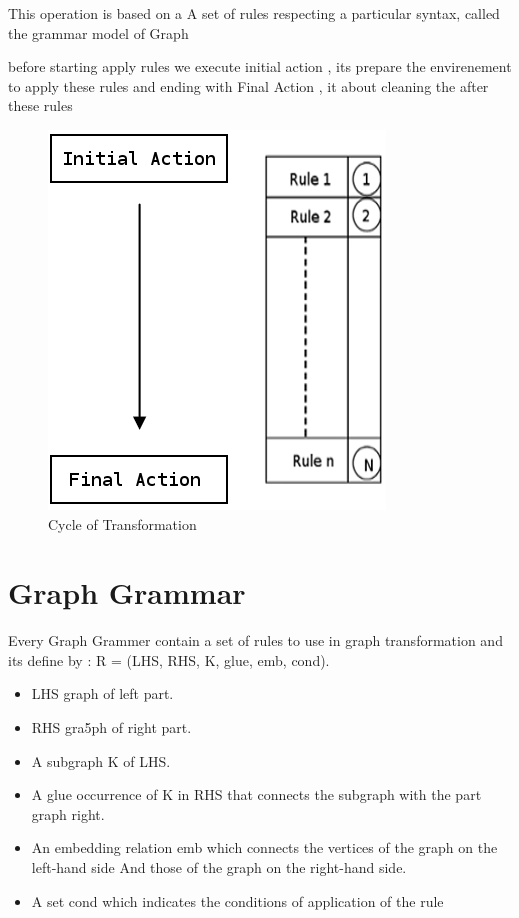  
This operation is based on a
A set of rules respecting a particular syntax, called the grammar model of
Graph

before starting apply rules we execute initial action , 
its prepare the envirenement to apply these rules
and ending with Final Action , it about cleaning the after these rules
\cite{ ch3-bid , ch3-spec }
\begin{figure}[th]
	\centering
		\includegraphics[scale=0.6]{Chapiter3/img/transGrammar}
	\caption{\label{fig:Cycle of Tranformation}Cycle of Transformation}
\end{figure} 

 
\section{Graph Grammar} 
Every Graph Grammer contain a set of rules  to use in graph transformation
and its define by :  \cite{ ch3-doc , ch3-spec }
R = (LHS, RHS, K, glue, emb, cond). 
\begin{itemize}
 
\item LHS graph of left part.
\item RHS gra5ph of right part.
\item A subgraph K of LHS.
\item A glue occurrence of K in RHS that connects the subgraph with the part graph  right.
\item An embedding relation emb which connects the vertices of the graph on the left-hand side
And those of the graph on the right-hand side.
\item A set cond which indicates the conditions of application of the rule
\end{itemize}

